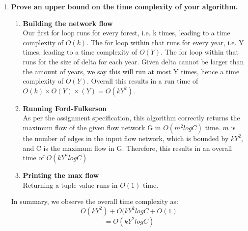\documentclass[11pt, oneside]{article}   	%
\begin{document}
\begin{enumerate}
\begin{enumerate}
		\item \textbf{Prove an upper bound on the time complexity of your algorithm.}
		\begin{enumerate}
		\item \textbf{Building the network flow}\\ 
		Our first for loop runs for every forest, i.e. k times, leading to a time complexity of $O(k)$. The for loop within that runs for every year, i.e. Y times, leading to a time complexity of $O(Y)$. The for loop within that runs for the size of delta for each year. Given delta cannot be larger than the amount of years, we say this will run at most Y times, hence a time complexity of $O(Y)$. Overall this results in a run time of $O(k)\times O(Y)\times (Y) = O(kY^2)$.
		\item \textbf{Running Ford-Fulkerson}\\
		As per the assignment specification, this algorithm correctly returns the maximum flow of the given flow network G in $O(m^2 log C)$ time. $m$ is the number of edges in the input flow network, which is bounded by $kY^2$, and C is the maximum flow in G. Therefore, this results in an overall time of $O(kY^2 log C)$
		\item \textbf{Printing the max flow}\\
		Returning a tuple value runs in $O(1)$ time.
		\end{enumerate}
		In summary, we observe the overall time complexity as:\\
		\[ O(kY^2) + O(kY^2 log C + O(1)\]
		\[ = O(kY^2 log C) \]
		\end{enumerate}

\end{enumerate}
\end{document}

